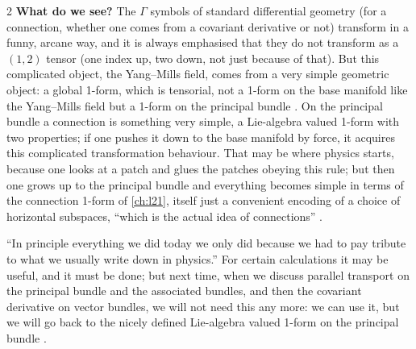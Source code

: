 \begin{paracol}{2}
\textbf{What do we see?}   The $\Gamma$ symbols of standard differential geometry (for a connection, whether one comes from a covariant derivative or not) transform in a funny, arcane way, and it is always emphasised that they do not transform as a $(1,2)$ tensor (one index up, two down, not just because of that). But this complicated object, the Yang--Mills field, comes from a very simple geometric object: a global 1-form, which is tensorial, not a 1-form on the base manifold like the Yang--Mills field but a 1-form on the principal bundle  . On the principal bundle a connection is something very simple, a Lie-algebra valued 1-form with two properties; if one pushes it down to the base manifold by force, it acquires this complicated transformation behaviour. That may be where physics starts, because one looks at a patch and glues the patches obeying this rule; but then one grows up to the principal bundle and everything becomes simple in terms of the connection 1-form of \cref{ch:l21}, itself just a convenient encoding of a choice of horizontal subspaces, ``which is the actual idea of connections''  .

``In principle everything we did today we only did because we had to pay tribute to what we usually write down in physics.'' For certain calculations it may be useful, and it must be done; but next time, when we discuss parallel transport on the principal bundle and the associated bundles, and then the covariant derivative on vector bundles, we will not need this any more: we can use it, but we will go back to the nicely defined Lie-algebra valued 1-form on the principal bundle  .


\end{paracol}
